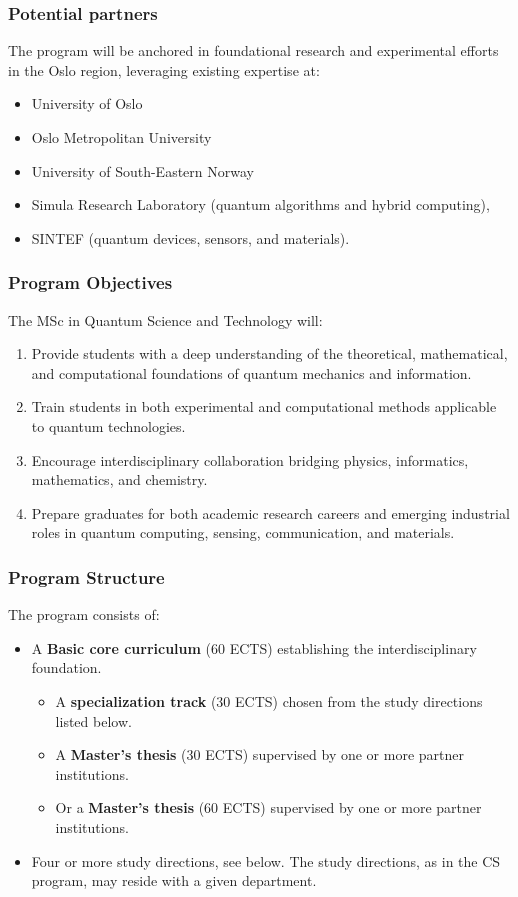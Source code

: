 \documentclass{beamer}
\begin{document}
\begin{frame}
\frametitle{Potential partners}
The program will be anchored in foundational research and experimental efforts in the Oslo region, leveraging existing expertise at:
\begin{itemize}
    \item University of Oslo 
    \item Oslo Metropolitan University
    \item University of South-Eastern Norway
    \item Simula Research Laboratory  (quantum algorithms and hybrid computing),
    \item SINTEF (quantum devices, sensors, and materials).
\end{itemize}


\end{frame}


\begin{frame}
\frametitle{Program Objectives}
The MSc in Quantum Science and Technology will:
\begin{enumerate}
    \item Provide students with a deep understanding of the theoretical, mathematical, and computational foundations of quantum mechanics and information.
    \item Train students in both experimental and computational methods applicable to quantum technologies.
    \item Encourage interdisciplinary collaboration bridging physics, informatics, mathematics, and chemistry.
    \item Prepare graduates for both academic research careers and emerging industrial roles in quantum computing, sensing, communication, and materials.
\end{enumerate}

\end{frame}


\begin{frame}
\frametitle{Program Structure}
The program consists of:
\begin{itemize}
\item A \textbf{Basic core curriculum} (60 ECTS) establishing the interdisciplinary foundation.
  \begin{itemize}
    \item A \textbf{specialization track} (30 ECTS) chosen from the study directions listed below.
    \item A \textbf{Master’s thesis} (30 ECTS) supervised by one or more partner institutions.
    \item Or a  \textbf{Master’s thesis} (60 ECTS) supervised by one or more partner institutions.      \end{itemize}
\item Four or more study directions, see below. The study directions, as in the CS program, may reside with a given department.
\end{itemize}

\end{frame}
\end{document}
